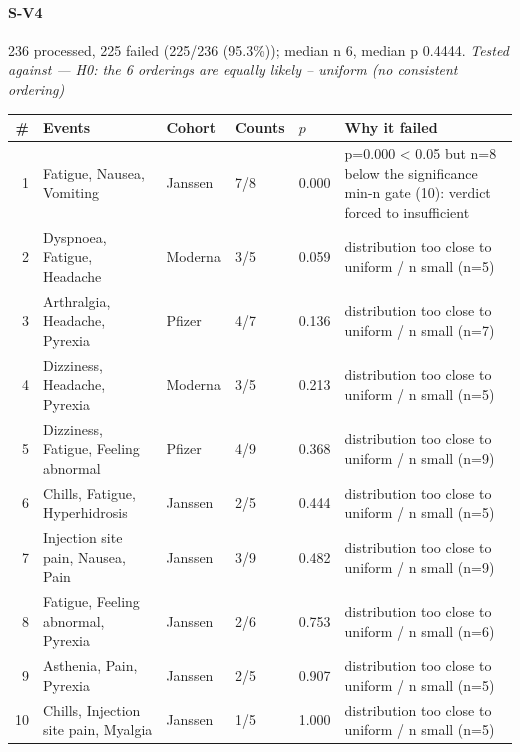 \documentclass[11pt]{article}
\begin{document}
\paragraph{S-V4} 236 processed, 225 failed (225/236 (95.3\%)); median n 6, median p 0.4444. \emph{Tested against --- H0: the 6 orderings are equally likely -- uniform (no consistent ordering)} \\
\begin{longtable}{@{}r p{3.9cm} p{2.5cm} l l p{4.4cm}@{}}
\toprule
\# & Events & Cohort & Counts & $p$ & Why it failed \\
\midrule \endhead
1 & Fatigue, Nausea, Vomiting & Janssen & 7/8 & 0.000 & p=0.000 < 0.05 but n=8 below the significance min-n gate (10): verdict forced to insufficient \\
2 & Dyspnoea, Fatigue, Headache & Moderna & 3/5 & 0.059 & distribution too close to uniform / n small (n=5) \\
3 & Arthralgia, Headache, Pyrexia & Pfizer & 4/7 & 0.136 & distribution too close to uniform / n small (n=7) \\
4 & Dizziness, Headache, Pyrexia & Moderna & 3/5 & 0.213 & distribution too close to uniform / n small (n=5) \\
5 & Dizziness, Fatigue, Feeling abnormal & Pfizer & 4/9 & 0.368 & distribution too close to uniform / n small (n=9) \\
6 & Chills, Fatigue, Hyperhidrosis & Janssen & 2/5 & 0.444 & distribution too close to uniform / n small (n=5) \\
7 & Injection site pain, Nausea, Pain & Janssen & 3/9 & 0.482 & distribution too close to uniform / n small (n=9) \\
8 & Fatigue, Feeling abnormal, Pyrexia & Janssen & 2/6 & 0.753 & distribution too close to uniform / n small (n=6) \\
9 & Asthenia, Pain, Pyrexia & Janssen & 2/5 & 0.907 & distribution too close to uniform / n small (n=5) \\
10 & Chills, Injection site pain, Myalgia & Janssen & 1/5 & 1.000 & distribution too close to uniform / n small (n=5) \\
\bottomrule
\end{longtable}
\end{document}
